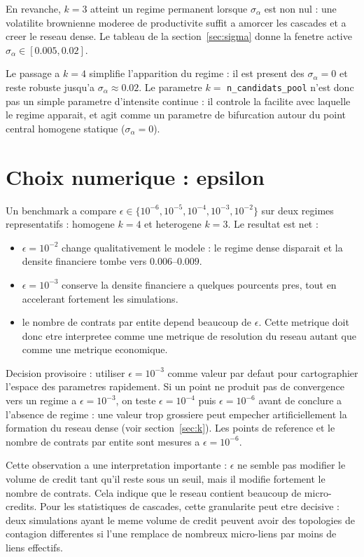 \documentclass[11pt,a4paper]{article}
\begin{document}
En revanche, \(k=3\) atteint un regime permanent lorsque
\(\sigma_\alpha\) est non nul : une volatilite brownienne moderee de
productivite suffit a amorcer les cascades et a creer le reseau dense.
Le tableau de la section~\ref{sec:sigma} donne la fenetre active
\(\sigma_\alpha\in[0.005,0.02]\).

Le passage a \(k=4\) simplifie l'apparition du regime : il est present des
\(\sigma_\alpha=0\) et reste robuste jusqu'a \(\sigma_\alpha\approx0.02\).
Le parametre \(k=\) \texttt{n\_candidats\_pool} n'est donc pas un simple
parametre d'intensite continue : il controle la facilite avec laquelle le
regime apparait, et agit comme un parametre de bifurcation autour du point
central homogene statique (\(\sigma_\alpha=0\)).

\section{Choix numerique : epsilon}

Un benchmark a compare \(\epsilon\in\{10^{-6},10^{-5},10^{-4},10^{-3},10^{-2}\}\)
sur deux regimes representatifs : homogene \(k=4\) et heterogene \(k=3\).
Le resultat est net :

\begin{itemize}
  \item \(\epsilon=10^{-2}\) change qualitativement le modele : le regime dense
  disparait et la densite financiere tombe vers \(0.006\)--\(0.009\).
  \item \(\epsilon=10^{-3}\) conserve la densite financiere a quelques pourcents
  pres, tout en accelerant fortement les simulations.
  \item le nombre de contrats par entite depend beaucoup de \(\epsilon\). Cette
  metrique doit donc etre interpretee comme une metrique de resolution du reseau
  autant que comme une metrique economique.
\end{itemize}

Decision provisoire : utiliser \(\epsilon=10^{-3}\) comme valeur par defaut
pour cartographier l'espace des parametres rapidement. Si un point ne produit
pas de convergence vers un regime a \(\epsilon=10^{-3}\), on teste
\(\epsilon=10^{-4}\) puis \(\epsilon=10^{-6}\) avant de conclure a l'absence
de regime : une valeur trop grossiere peut empecher artificiellement la
formation du reseau dense (voir section~\ref{sec:k}). Les points de reference
et le nombre de contrats par entite sont mesures a \(\epsilon=10^{-6}\).

Cette observation a une interpretation importante : \(\epsilon\) ne semble pas
modifier le volume de credit tant qu'il reste sous un seuil, mais il modifie
fortement le nombre de contrats. Cela indique que le reseau contient beaucoup de
micro-credits. Pour les statistiques de cascades, cette granularite peut etre
decisive : deux simulations ayant le meme volume de credit peuvent avoir des
topologies de contagion differentes si l'une remplace de nombreux micro-liens
par moins de liens effectifs.
\end{document}
